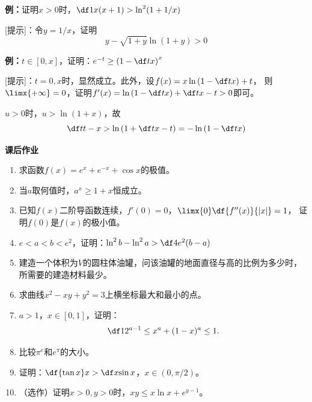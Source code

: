 {\bf 例：}证明$x>0$时，$\df1{x(x+1)}>\ln^2(1+1/x)$

[提示]：令$y=1/x$，证明
$$y-\sqrt{1+y}\ln(1+y)>0$$

% 

{\bf 例：}$t\in[0,x]$，证明：$e^{-t}\geq\left(1-\df tx\right)^x$

[提示]：$t=0,x$时，显然成立。此外，设$f(x)=x\ln\left(1-\df tx\right)+t$，
则$\limx{+\infty}=0$，证明$f'(x)=\ln\left(1-\df tx\right)+\df t{x-t}>0$即可。

$u>0$时，$u>\ln(1+x)$，故
$$\df t{t-x}>\ln\left(1+\df t{x-t}\right)=-\ln\left(1-\df tx\right)$$

% 

\begin{ext}
	{\bf 课后作业}
	
	\begin{enumerate}
	  \item 求函数$f(x)=e^x+e^{-x}+\cos x$的极值。
	  \item 当$a$取何值时，$a^x\geq1+x$恒成立。
	  \item 已知$f(x)$二阶导函数连续，$f'(0)=0$，$\limx{0}\df{f''(x)}{|x|}=1$，
	  证明$f(0)$是$f(x)$的极小值。
	  \item $e<a<b<e^2$，证明：$\ln^2b-\ln^2a>\df4{e^2}(b-a)$
	  \item 建造一个体积为$V$的圆柱体油罐，问该油罐的地面直径与高的比例为多少时，
	  所需要的建造材料最少。
	  \item 求曲线$x^2-xy+y^2=3$上横坐标最大和最小的点。
	  \item $a>1$，$x\in[0,1]$，证明：
	  $$\df1{2^{a-1}}\leq x^a+(1-x)^a\leq 1.$$
	  \item 比较$\pi^e$和$e^{\pi}$的大小。
	  \item 证明：$\df{\tan x}x>\df x{\sin x}$，$x\in(0,\pi/2)$。
	  \item （选作）证明$x>0,y>0$时，$xy\leq x\ln x+e^{y-1}$。
	\end{enumerate}
\end{ext}

